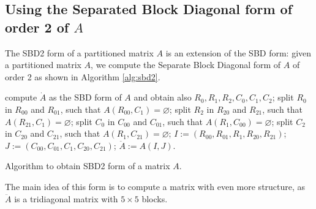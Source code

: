 \subsection{Using the Separated Block Diagonal form of order 2 of $A$}

The SBD2 form of a partitioned matrix $A$ is an extension of the SBD form: given a partitioned matrix $A$, we compute the Separate Block Diagonal form of $A$ of order 2 as shown in Algorithm \ref{alg:sbd2}. 

\begin{algorithm}[h]
	\begin{algorithmic}
		\State compute $\dot{A}$ as the SBD form of $A$ and obtain also $R_0,R_1,R_2,C_0,C_1,C_2$;
		\State split $R_0$ in $R_{00}$ and $R_{01}$, such that $A(R_{00},C_1) = \varnothing$;
		\State split $R_2$ in $R_{20}$ and $R_{21}$, such that $A(R_{21},C_1) = \varnothing$;
		\State split $C_0$ in $C_{00}$ and $C_{01}$, such that $A(R_1,C_{00}) = \varnothing$;
		\State split $C_2$ in $C_{20}$ and $C_{21}$, such that $A(R_1,C_{21}) = \varnothing$;
		\State $I:= (R_{00},R_{01},R_1,R_{20},R_{21})$;
		\State $J:= (C_{00},C_{01},C_1,C_{20},C_{21})$;
		\State $\ddot{A} := A(I,J)$.
	\end{algorithmic}
	\caption{Algorithm to obtain SBD2 form of a matrix $A$.} \label{alg:sbd2}
\end{algorithm}

The main idea of this form is to compute a matrix with even more structure, as $\ddot{A}$ is a tridiagonal matrix with $ 5 \times 5$ blocks.

